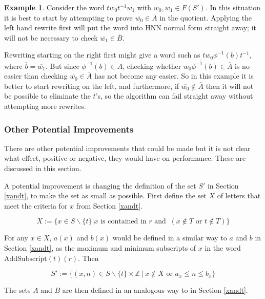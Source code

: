 \documentclass[11pt]{article} %
\theoremstyle{definition}
\theoremstyle{definition}
\theoremstyle{definition}
\theoremstyle{definition}
\theoremstyle{definition}
\theoremstyle{definition}
\newtheorem{exmpl}{Example}[theorem]
\begin{document}
\begin{exmpl}\label{rtlbad}
Consider the word $tw_0t^{-1}w_1$ with $w_0, w_1 \in F(S')$. In this situation
it is best to start by attempting to prove $\overline{w_0} \in \overline{A}$ in the quotient.
Applying the left hand rewrite first will put the word into HNN normal form
straight away; it will not be necessary to check $\overline{w_1} \in \overline{B}$.

Rewriting starting on the right first might give a word such as
$tw_0 \phi^{-1}(b)t^{-1}$, where $\overline{b} = \overline{w_1}$. But since
$\phi^{-1}(b) \in A$, checking whether $\overline{w_0\phi^{-1}(b)} \in \overline{A}$ is
no easier than checking $\overline{w_0} \in \overline{A}$ has not become
any easier. So in this example it is better to start rewriting on the left, and furthermore,
if $\overline{w_0} \notin \overline{A}$ then it will not be possible to eliminate the $t$'s, so the
algorithm can fail straight away without attempting more rewrites.

\subsubsection{Other Potential Improvements}

There are other potential improvements that could be made but it is not clear
what effect, positive or negative, they would have on performance. These are discussed
in this section.

A potential improvement is changing the definition of the set $S'$ in Section \ref{xandt},
to make the set as small as possible.
First define the set $X$
of letters that meet the criteria for $x$ from Section \ref{xandt}.

\begin{equation}
  X := \{ x \in S \backslash \{t\} |
    x \text{ is contained in }r \text{ and } \ (x \notin T \text{ or } t \notin T) \}
\end{equation}

For any $x \in X$, $a(x)$ and $b(x)$ would be defined in a similar way to $a$ and
$b$ in Section \ref{xandt}, as the maximum and minimum subscripts of $x$ in the word
$\text{AddSubscript}(t)(r)$. Then

\begin{equation}
  S' := \{(x, n) \in S \backslash \{t\} \times \mathbb{Z} \
| \ x \notin X \text{ or } a_x \le n \le b_x \}
\end{equation}

The sets $A$ and $B$ are then defined in an analogous way to in Section \ref{xandt}.


\end{exmpl}
\end{document}
